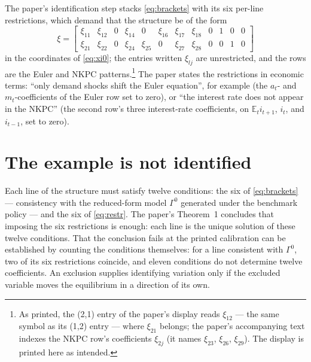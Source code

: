 \documentclass[11pt]{article}
\theoremstyle{remark}
\newcommand{\E}{\mathbb{E}}
\begin{document}
The paper's identification step stacks \eqref{eq:brackets} with its six per-line restrictions, which demand that the structure be of the form
\begin{equation}\tag{Restrictions}\label{eq:restr}
\xi=\begin{bmatrix} \xi_{11} & \xi_{12} & 0 & \xi_{14} & 0 & \xi_{16} & \xi_{17} & \xi_{18} & 0 & 1 & 0 & 0\\
\xi_{21} & \xi_{22} & 0 & \xi_{24} & \xi_{25} & 0 & \xi_{27} & \xi_{28} & 0 & 0 & 1 & 0
\end{bmatrix}
\end{equation}
in the coordinates of \eqref{eq:xi0}; the entries written $\xi_{lj}$ are unrestricted, and the rows are the Euler and NKPC patterns.\footnote{As printed, the (2,1) entry of the paper's display reads $\xi_{12}$ --- the same symbol as its (1,2) entry --- where $\xi_{21}$ belongs; the paper's accompanying text indexes the NKPC row's coefficients $\xi_{2j}$ (it names $\xi_{23}$, $\xi_{26}$, $\xi_{29}$). The display is printed here as intended.} The paper states the restrictions in economic terms: ``only demand shocks shift the Euler equation'', for example (the $a_t$- and $m_t$-coefficients of the Euler row set to zero), or ``the interest rate does not appear in the NKPC'' (the second row's three interest-rate coefficients, on $\E_ti_{t+1}$, $i_t$, and $i_{t-1}$, set to zero).

\section{The example is not identified}\label{sec:exhibit}

Each line of the structure must satisfy twelve conditions: the six of \eqref{eq:brackets} --- consistency with the reduced-form model $\Gamma^0$ generated under the benchmark policy --- and the six of \eqref{eq:restr}. The paper's Theorem~1 concludes that imposing the six restrictions is enough: each line is the unique solution of these twelve conditions. That the conclusion fails at the printed calibration can be established by counting the conditions themselves: for a line consistent with $\Gamma^0$, two of its six restrictions coincide, and eleven conditions do not determine twelve coefficients. An exclusion supplies identifying variation only if the excluded variable moves the equilibrium in a direction of its own.
\end{document}

